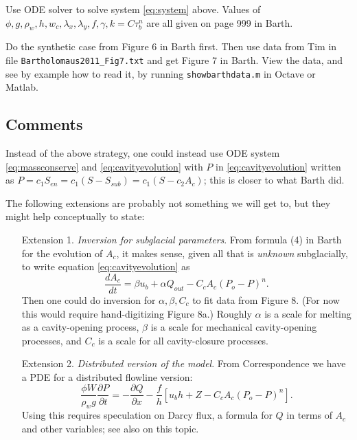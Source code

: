 \documentclass[11pt,final]{amsart}%
\newcommand{\citep}[1]{\cite{#1}}
\begin{document}
Use ODE solver to solve system \eqref{eq:system} above.  Values of $\phi,g,\rho_w,h,w_c,\lambda_x,\lambda_y,f,\gamma,k=C\tau_b^n$ are all given on page 999 in Barth.

Do the synthetic case from Figure 6 in Barth first.  Then use data from Tim in file \texttt{Bartholomaus2011_Fig7.txt} and get Figure 7 in Barth.  View the data, and see by example how to read it, by running \texttt{showbarthdata.m} in Octave or Matlab.

\subsection*{Comments}  Instead of the above strategy, one could instead use ODE system \eqref{eq:massconserve} and \eqref{eq:cavityevolution} with $P$ in \eqref{eq:cavityevolution} written as $P= c_1 S_{en} = c_1 (S - S_{sub}) = c_1 (S - c_2 A_c)$; this is closer to what Barth did.

The following extensions are probably not something we will get to, but they might help conceptually to state:

\begin{itemize}

\item[Extension 1.\quad] \emph{Inversion for subglacial parameters}.  From formula (4) in Barth for the evolution of $A_c$, it makes sense, given all that is \emph{unknown} subglacially, to write equation \eqref{eq:cavityevolution} as
\begin{equation}
\frac{dA_c}{dt} = \beta u_b + \alpha Q_{out} - C_c A_c (P_o-P)^n. \label{eq:cavityevolutionforinversion}
\end{equation}
Then one could do inversion for $\alpha,\beta,C_c$ to fit data from Figure 8.  (For now this would require hand-digitizing Figure 8a.)  Roughly $\alpha$ is a scale for melting as a cavity-opening process, $\beta$ is a scale for mechanical cavity-opening processes, and $C_c$ is a scale for all cavity-closure processes.

\item[Extension 2.\quad] \emph{Distributed version of the model}.  From Correspondence \citep{Bueler2014correspondence} we have a PDE for a distributed flowline version:
\begin{equation}
\frac{\phi W}{\rho_w g} \frac{\partial P}{\partial t} = - \frac{\partial Q}{\partial x} - \frac{f}{h} \left[u_b h + Z - C_c A_c (P_o-P)^n\right]. \label{eq:barth:distpressure}
\end{equation}
Using this requires speculation on Darcy flux, a formula for $Q$ in terms of $A_c$ and other variables; see also \cite{BuelervanPeltDRAFT} on this topic.

\end{itemize}
\end{document}
